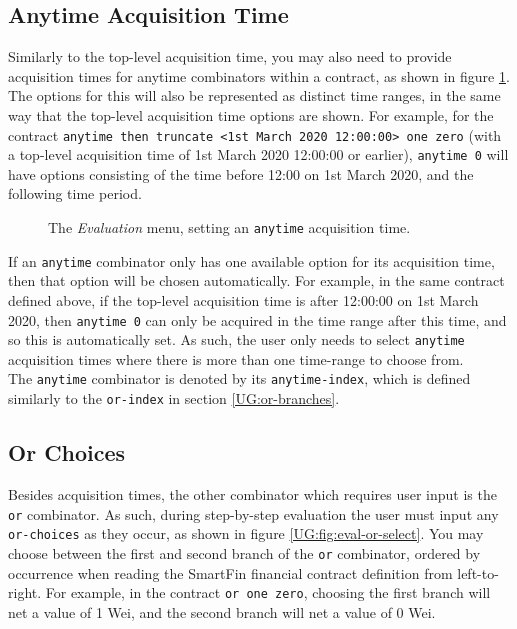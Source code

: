 \documentclass{article}
\begin{document}
\subsection{Anytime Acquisition Time}

Similarly to the top-level acquisition time, you may also need to provide acquisition times for anytime combinators within a contract, as shown in figure \ref{UG:fig:eval-anytime-select}. The options for this will also be represented as distinct time ranges, in the same way that the top-level acquisition time options are shown. For example, for the contract \texttt{anytime then truncate <1st March 2020 12:00:00> one zero} (with a top-level acquisition time of 1st March 2020 12:00:00 or earlier), \texttt{anytime 0} will have options consisting of the time before 12:00 on 1st March 2020, and the following time period.

\begin{figure}[h]
    \centering
    \caption{The \textit{Evaluation} menu, setting an \texttt{anytime} acquisition time.}
    \label{UG:fig:eval-anytime-select}
\end{figure}

If an \texttt{anytime} combinator only has one available option for its acquisition time, then that option will be chosen automatically. For example, in the same contract defined above, if the top-level acquisition time is after 12:00:00 on 1st March 2020, then \texttt{anytime 0} can only be acquired in the time range after this time, and so this is automatically set. As such, the user only needs to select \texttt{anytime} acquisition times where there is more than one time-range to choose from. \\

The \texttt{anytime} combinator is denoted by its \texttt{anytime-index}, which is defined similarly to the \texttt{or-index} in section \ref{UG:or-branches}.


\subsection{Or Choices}

Besides acquisition times, the other combinator which requires user input is the \texttt{or} combinator. As such, during step-by-step evaluation the user must input any \texttt{or-choices} as they occur, as shown in figure \ref{UG:fig:eval-or-select}. You may choose between the first and second branch of the \texttt{or} combinator, ordered by occurrence when reading the SmartFin financial contract definition from left-to-right. For example, in the contract \texttt{or one zero}, choosing the first branch will net a value of 1 Wei, and the second branch will net a value of 0 Wei.
\end{document}
